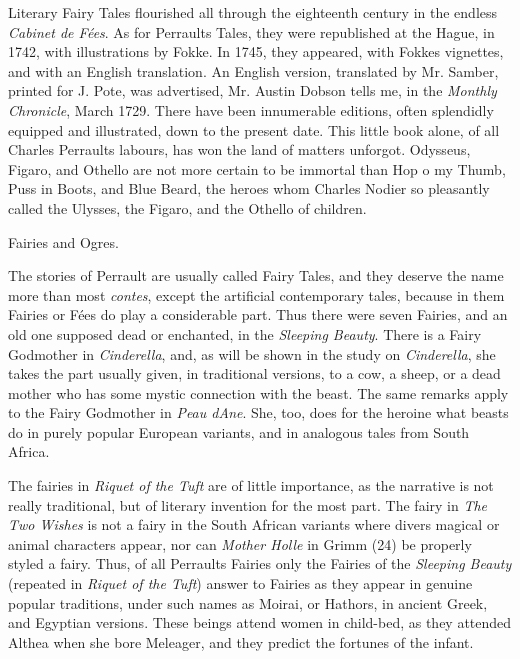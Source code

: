 \documentclass[14pt,a4paper]{memoir}
\begin{document}
{Literary Fairy Tales flourished all through the eighteenth century in
the endless \emph{Cabinet de Fées}. As for Perrault\textquotesingle s
Tales, they were republished at the Hague, in 1742, with illustrations
by Fokke. In 1745, they appeared, with Fokke\textquotesingle s
vignettes, and with an English translation. An English version,
translated by Mr. Samber, printed for J. Pote, was advertised, Mr.
Austin Dobson tells me, in the \emph{Monthly Chronicle}, March 1729.
There have been innumerable editions, often splendidly equipped and
illustrated, down to the present date. This little book alone, of all
Charles Perrault\textquotesingle s labours, has won \textquotesingle the
land of matters unforgot.\textquotesingle{} Odysseus, Figaro, and
Othello are not more certain to be immortal than Hop o\textquotesingle{}
my Thumb, Puss in Boots, and Blue Beard, the heroes whom Charles Nodier
so pleasantly called \textquotesingle the Ulysses, the Figaro, and the
Othello of children.\textquotesingle{}

{Fairies and Ogres.}

The stories of Perrault are usually called \textquotesingle Fairy
Tales,\textquotesingle{} and they deserve the name more than most
\emph{contes}, except the artificial contemporary tales, because in them
Fairies or Fées do play a considerable part. Thus there were seven
Fairies, and an old one \textquotesingle supposed dead or
enchanted,\textquotesingle{} in the \emph{Sleeping Beauty}. There is a
Fairy Godmother in \emph{Cinderella}, and, as will be shown in the study
on \emph{Cinderella}, she takes the part usually given, in traditional
versions, to a cow, a sheep, or a dead mother who has some mystic
connection with the beast. The same remarks apply to the Fairy Godmother
in \emph{Peau d\textquotesingle Ane}. She, too, does for the heroine
what beasts do in purely popular European variants, and in analogous
tales from South Africa.

The fairies in \emph{Riquet of the Tuft} are of little importance, as
the narrative is not really traditional, but of literary invention for
the most part. The fairy in \emph{The Two Wishes} is not a fairy in the
South African variants where divers magical or animal characters appear,
nor can \emph{Mother Holle} in Grimm (24) be properly styled a fairy.
Thus, of all Perrault\textquotesingle s Fairies only the Fairies of the
\emph{Sleeping Beauty} (repeated in \emph{Riquet of the Tuft}) answer to
Fairies as they appear in genuine popular traditions, under such names
as Moirai, or Hathors, in ancient Greek, and Egyptian versions. These
beings attend women in child-bed, as they attended Althea when she bore
Meleager, and they predict the fortunes of the infant.

}
\end{document}
